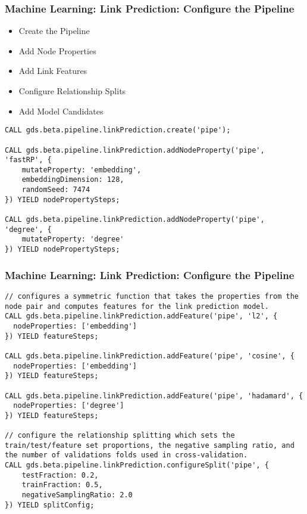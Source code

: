 \begin{frame}[fragile]\frametitle{Machine Learning: Link Prediction: Configure the Pipeline}

\begin{itemize}
\item Create the Pipeline
\item Add Node Properties
\item Add Link Features
\item Configure Relationship Splits
\item Add Model Candidates
\end{itemize}

\begin{lstlisting}
CALL gds.beta.pipeline.linkPrediction.create('pipe');

CALL gds.beta.pipeline.linkPrediction.addNodeProperty('pipe', 'fastRP', {
    mutateProperty: 'embedding',
    embeddingDimension: 128,
    randomSeed: 7474
}) YIELD nodePropertySteps;

CALL gds.beta.pipeline.linkPrediction.addNodeProperty('pipe', 'degree', {
    mutateProperty: 'degree'
}) YIELD nodePropertySteps;
\end{lstlisting}

\end{frame}

\begin{frame}[fragile]\frametitle{Machine Learning: Link Prediction: Configure the Pipeline}

\begin{lstlisting}
// configures a symmetric function that takes the properties from the node pair and computes features for the link prediction model. 
CALL gds.beta.pipeline.linkPrediction.addFeature('pipe', 'l2', {
  nodeProperties: ['embedding']
}) YIELD featureSteps;

CALL gds.beta.pipeline.linkPrediction.addFeature('pipe', 'cosine', {
  nodeProperties: ['embedding']
}) YIELD featureSteps;

CALL gds.beta.pipeline.linkPrediction.addFeature('pipe', 'hadamard', {
  nodeProperties: ['degree']
}) YIELD featureSteps;

// configure the relationship splitting which sets the train/test/feature set proportions, the negative sampling ratio, and the number of validations folds used in cross-validation. 
CALL gds.beta.pipeline.linkPrediction.configureSplit('pipe', {
    testFraction: 0.2,
    trainFraction: 0.5,
    negativeSamplingRatio: 2.0
}) YIELD splitConfig;
\end{lstlisting}

\end{frame}

